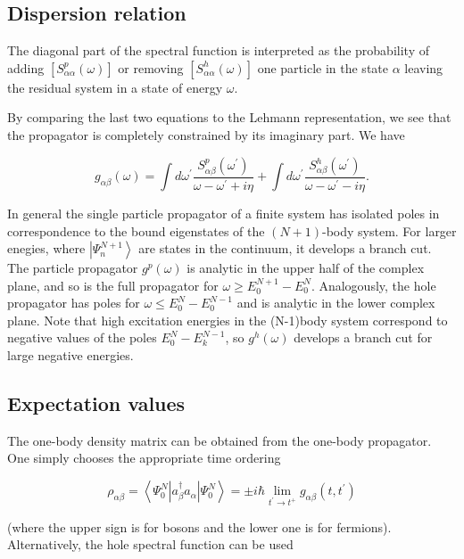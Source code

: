 {\subsection{Dispersion relation}

The diagonal part of the spectral function is interpreted as the
probability of adding $\left[S_{\alpha \alpha}^{p}(\omega)\right]$ or
removing $\left[S_{\alpha \alpha}^{h}(\omega)\right]$ one particle in
the state $\alpha$ leaving the residual system in a state of energy
$\omega$.

By comparing the last two equations to the Lehmann representation, we
see that the propagator is completely constrained by its imaginary
part. We have

$$
g_{\alpha \beta}(\omega)=\int d \omega^{\prime} \frac{S_{\alpha \beta}^{p}\left(\omega^{\prime}\right)}{\omega-\omega^{\prime}+i \eta}+\int d \omega^{\prime} \frac{S_{\alpha \beta}^{h}\left(\omega^{\prime}\right)}{\omega-\omega^{\prime}-i \eta} .
$$

In general the single particle propagator of a finite system has
isolated poles in correspondence to the bound eigenstates of the
$(N+1)$-body system. For larger enegies, where
$\left|\Psi_{n}^{N+1}\right\rangle$ are states in the continuum, it
develops a branch cut. The particle propagator $g^{p}(\omega)$ is
analytic in the upper half of the complex plane, and so is the full
propagator for $\omega \geq
E_{0}^{N+1}-E_{0}^{N}$. Analogously, the hole propagator has poles for
$\omega \leq E_{0}^{N}-E_{0}^{N-1}$ and is analytic in the lower
complex plane. Note that high excitation energies in the (N-1)body
system correspond to negative values of the poles
$E_{0}^{N}-E_{k}^{N-1}$, so $g^{h}(\omega)$ develops a branch cut for
large negative energies.


\subsection{Expectation values}

The one-body density matrix can be obtained from the one-body
propagator. One simply chooses the appropriate time ordering

$$
\rho_{\alpha \beta}=\left\langle\Psi_{0}^{N}\left|a_{\beta}^{\dagger} a_{\alpha}\right| \Psi_{0}^{N}\right\rangle= \pm i \hbar \lim _{t^{\prime} \rightarrow t^{+}} g_{\alpha \beta}\left(t, t^{\prime}\right)
$$

(where the upper sign is for bosons and the lower one is for fermions). Alternatively, the hole spectral function can be used

}
